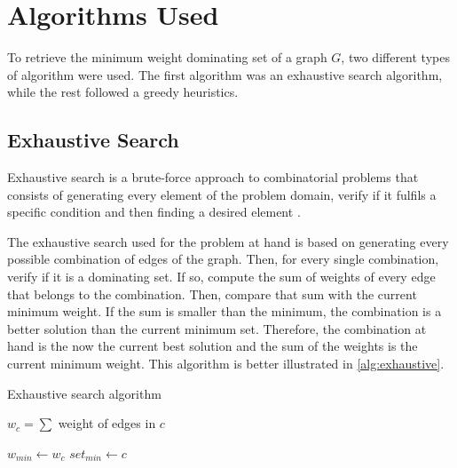 \section{Algorithms Used}\label{section:algorithms-used}
To retrieve the minimum weight dominating set of a graph $G$, two different types of algorithm were used.
The first algorithm was an exhaustive search algorithm, while the rest followed a greedy heuristics.

\subsection{Exhaustive Search}\label{section:exhaustive-search}

Exhaustive search is a brute-force approach to combinatorial problems that consists of generating every element of the problem domain, verify if it fulfils a specific condition and then finding a desired element \cite{levitin2012introduction}.

The exhaustive search used for the problem at hand is based on generating every possible combination of edges of the graph.
Then, for every single combination, verify if it is a dominating set.
If so, compute the sum of weights of every edge that belongs to the combination.
Then, compare that sum with the current minimum weight.
If the sum is smaller than the minimum, the combination is a better solution than the current minimum set.
Therefore, the combination at hand is the now the current best solution and the sum of the weights is the current minimum weight.
This algorithm is better illustrated in \autoref{alg:exhaustive}.

\begin{algorithm}
\caption{Exhaustive search algorithm}
\label{alg:exhaustive}
\begin{algorithmic}


        $w_c = \sum$ weight of edges in $c$
        

           \State $w_{min} \gets w_c$
           \State $set_{min} \gets c$

        \EndIf        
    \EndIf

\EndFor

\end{algorithmic}
\end{algorithm}

